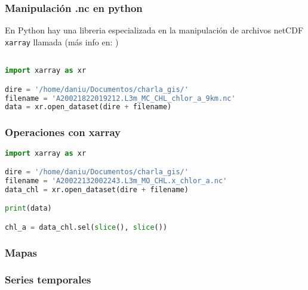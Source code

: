 \documentclass{beamer}
\begin{document}
\begin{frame}[fragile]
\frametitle{Manipulación .nc en python}

En Python hay una libreria especializada en la manipulación de archivos netCDF \texttt{xarray} llamada (más info en: \href{http://xarray.pydata.org/en/stable/}{})

\begin{lstlisting}[language=python, basicstyle=\scriptsize]

import xarray as xr

dire = '/home/daniu/Documentos/charla_gis/'
filename = 'A20021822019212.L3m_MC_CHL_chlor_a_9km.nc'
data = xr.open_dataset(dire + filename)

\end{lstlisting}

\begin{figure}
	
	
\end{figure}
\end{frame}


\begin{frame}[fragile]
\frametitle{Operaciones con xarray}

\begin{lstlisting}[language=python, basicstyle=\scriptsize]
import xarray as xr

dire = '/home/daniu/Documentos/charla_gis/'
filename = 'A20022132002243.L3m_MO_CHL.x_chlor_a.nc'
data_chl = xr.open_dataset(dire + filename)

print(data)

chl_a = data_chl.sel(slice(), slice())

\end{lstlisting}

\end{frame}


\begin{frame}[fragile]
\frametitle{Mapas}

\end{frame}

\begin{frame}[fragile]
\frametitle{Series temporales}

\end{frame}
\end{document}
